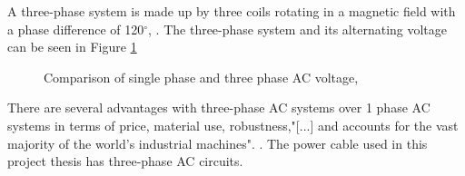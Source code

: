 \noindent A three-phase system is made up by three coils rotating in a magnetic field with a phase difference of 120$^{\circ}$, \cite{Dale2000}. The three-phase system and its alternating voltage can be seen in Figure \ref{fig:volt} 

\begin{figure}[H]
\hfill
{}\hfill
\caption[$\; \:$Comparison of single phase and three phase AC voltage]{Comparison of single phase and three phase AC voltage, \cite{Dale2000}}
\label{fig:volt}
\end{figure}

\noindent There are several advantages with three-phase AC systems over 1 phase AC systems in terms of price, material use, robustness,"[...] and accounts for the vast majority of the world's industrial machines". \cite{1995Tac}. The power cable used in this project thesis has three-phase AC circuits. 
 


